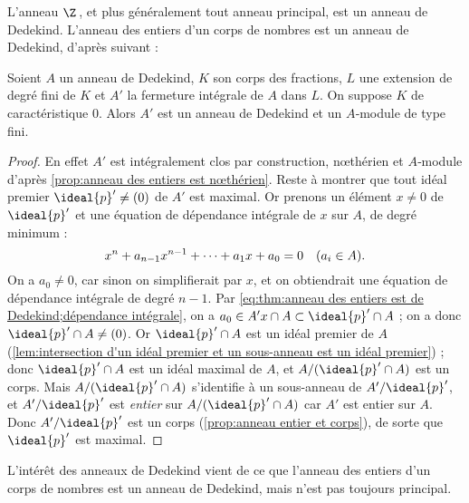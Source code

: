 \documentclass[11pt, useosf,
  title in boldface,
  theorem in new line,
  theorem numbering = section,
  number theorems separately,
]{simplivre}
\begin{document}
    L'anneau \( \Z \)\,, et plus généralement tout anneau principal, est un anneau de Dedekind. L'anneau des entiers d'un corps de nombres est un anneau de Dedekind, d'après  suivant :

    \begin{theorem}\label{thm:anneau des entiers est de Dedekind}
        Soient \( A \) un anneau de Dedekind, \( K \) son corps des fractions, \( L \) une extension de degré fini de \( K \) et \( A' \) la fermeture intégrale de \( A \) dans \( L \). On suppose \( K \) de caractéristique \( 0 \). Alors \( A' \) est un anneau de Dedekind et un \( A \)‑module de type fini.
    \end{theorem}
    \begin{proof}
        En effet \( A' \) est intégralement clos par construction, nœthérien et \( A \)‑module d'après \cref{prop:anneau des entiers est nœthérien}. Reste à montrer que tout idéal premier \( \ideal{p}' \neq (0) \) de \( A' \) est maximal. Or prenons un élément \( x \neq 0 \) de \( \ideal{p}' \) et une équation de dépendance intégrale de \( x \) sur \( A \), de degré minimum :
        \begin{equation}\label{eq:thm:anneau des entiers est de Dedekind;dépendance intégrale}
            x^n + a_{n-1}x^{n-1} + \cdots + a_1 x + a_0 = 0 \quad \text{(\( a_i \in A \))}.
        \end{equation}
        On a \( a_0 \neq 0 \), car sinon on simplifierait par \( x \), et on obtiendrait une équation de dépendance intégrale de degré \( n-1 \). Par \eqref{eq:thm:anneau des entiers est de Dedekind;dépendance intégrale}, on a \( a_0 \in A'x \cap A \subset \ideal{p}' \cap A \) ; on a donc \( \ideal{p}' \cap A \neq (0) \). Or \( \ideal{p}' \cap A \) est un idéal premier de \( A \) (\cref{lem:intersection d'un idéal premier et un sous-anneau est un idéal premier}) ; donc \( \ideal{p}' \cap A \) est un idéal maximal de \( A \), et \( A/(\ideal{p}' \cap A) \) est un corps. Mais \( A/(\ideal{p}' \cap A) \) s'identifie à un sous-anneau de \( A'/\ideal{p}' \), et \( A'/\ideal{p}' \) est \emph{entier} sur \( A/(\ideal{p}' \cap A) \) car \( A' \) est entier sur \( A \). Donc \( A'/\ideal{p}' \) est un corps (\cref{prop:anneau entier et corps}), de sorte que \( \ideal{p}' \) est maximal.
    \end{proof}

    L'intérêt des anneaux de Dedekind vient de ce que l'anneau des entiers d'un corps de nombres est un anneau de Dedekind, mais n'est pas toujours principal.
\end{document}
